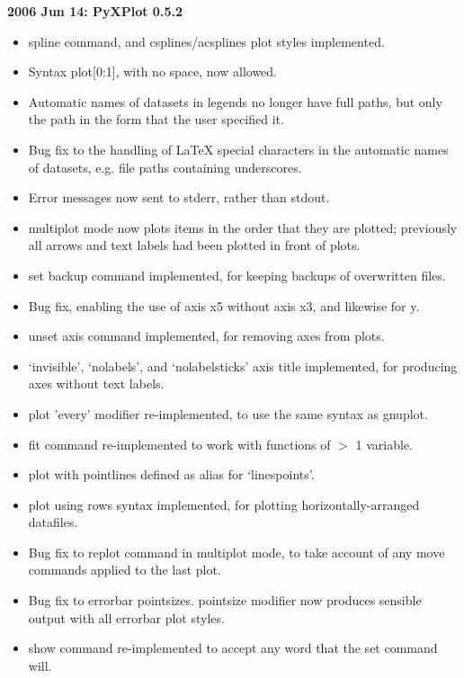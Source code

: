 \documentclass[a4paper,onecolumn,11pt]{book}
\begin{document}
\noindent \textbf{2006 Jun 14: PyXPlot 0.5.2}
\begin{itemize}
\item spline command, and csplines/acsplines plot styles implemented.
\item Syntax plot[0:1], with no space, now allowed.
\item Automatic names of datasets in legends no longer have full paths, but only the path in the form that the user specified it.
\item Bug fix to the handling of LaTeX special characters in the automatic names of datasets, e.g. file paths containing underscores.
\item Error messages now sent to stderr, rather than stdout.
\item multiplot mode now plots items in the order that they are plotted; previously all arrows and text labels had been plotted in front of plots.
\item set backup command implemented, for keeping backups of overwritten files.
\item Bug fix, enabling the use of axis x5 without axis x3, and likewise for y.
\item unset axis command implemented, for removing axes from plots.
\item `invisible', `nolabels', and `nolabelsticks' axis title implemented, for producing axes without text labels.
\item plot 'every' modifier re-implemented, to use the same syntax as gnuplot.
\item fit command re-implemented to work with functions of $>$ 1 variable.
\item plot with pointlines defined as alias for `linespoints'.
\item plot using rows syntax implemented, for plotting horizontally-arranged datafiles.
\item Bug fix to replot command in multiplot mode, to take account of any move commands applied to the last plot.
\item Bug fix to errorbar pointsizes. pointsize modifier now produces sensible output with all errorbar plot styles.
\item show command re-implemented to accept any word that the set command will.
\end{itemize}
\end{document}

